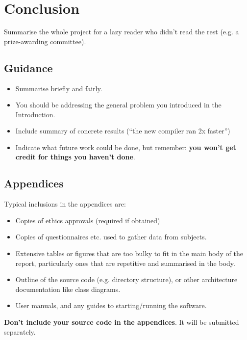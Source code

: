 \documentclass{l4proj}
\begin{document}
\chapter{Conclusion}    
Summarise the whole project for a lazy reader who didn't read the rest (e.g. a prize-awarding committee).
\section{Guidance}
\begin{itemize}
    \item
        Summarise briefly and fairly.
    \item
        You should be addressing the general problem you introduced in the
        Introduction.
    \item
        Include summary of concrete results (``the new compiler ran 2x
        faster'')
    \item
        Indicate what future work could be done, but remember: \textbf{you
        won't get credit for things you haven't done}.
\end{itemize}





\begin{appendices}

\chapter{Appendices}

Typical inclusions in the appendices are:

\begin{itemize}
\item
  Copies of ethics approvals (required if obtained)
\item
  Copies of questionnaires etc. used to gather data from subjects.
\item
  Extensive tables or figures that are too bulky to fit in the main body of
  the report, particularly ones that are repetitive and summarised in the body.

\item Outline of the source code (e.g. directory structure), or other architecture documentation like class diagrams.

\item User manuals, and any guides to starting/running the software.

\end{itemize}

\textbf{Don't include your source code in the appendices}. It will be
submitted separately.

\end{appendices}





\end{document}
